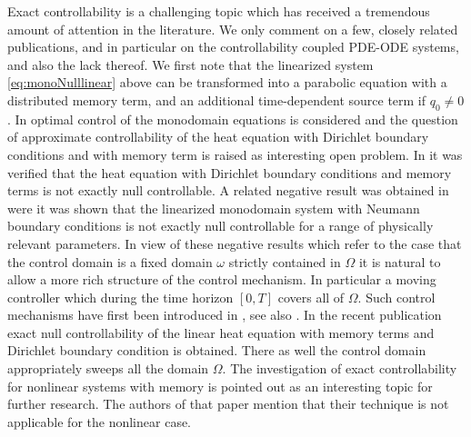 \documentclass[10pt]{article}
\begin{document}
Exact controllability is a challenging topic which has received a tremendous amount of attention in the literature. We only comment on a few, closely related publications, { and in particular on the controllability  coupled PDE-ODE systems, and also the lack thereof.
We first note} that the linearized system \eqref{eq:monoNulllinear} above can be transformed into a parabolic equation with a distributed memory term, and an additional time-dependent  source term if $q_0\neq0$.
In \cite{brandao} optimal control of the monodomain equations is considered and  the question of approximate controllability of the heat equation with Dirichlet boundary conditions and   with memory term is raised as interesting open problem. In \cite{guerrero_imanu} it was verified that the heat equation with Dirichlet boundary conditions and memory terms is not exactly null controllable.   A related negative result was obtained in  \cite{breiten_kunisch} were it  was shown that the linearized monodomain system with Neumann boundary conditions is not exactly null controllable for a  range of physically relevant parameters.
{ In view of these negative results which refer to the case that the control domain is a fixed domain $\omega$ strictly contained in $\Omega$ it is natural to allow a more rich structure of the control mechanism. In particular a moving controller which during the time horizon $[0,T]$ covers all of $\Omega$. Such control mechanisms have first been introduced in \cite{martin_rosier_moving}, see also \cite{CSZR}.
In the recent publication \cite{zuazua_memory} exact null controllability of the linear heat equation with memory terms and Dirichlet boundary condition is obtained. There as well  the control domain appropriately   sweeps all the domain $\Omega$. The investigation of exact controllability for nonlinear systems with memory is pointed out as an interesting topic for further research. The authors of that paper mention that their technique is not applicable for the nonlinear case.}
\end{document}
